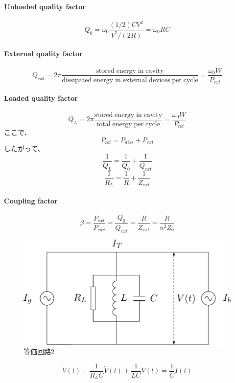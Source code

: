 \documentclass[book]{jlreq}
\begin{document}
\paragraph{Unloaded quality factor}
%
\begin{equation}
    Q_0 = \omega_0 \frac{(1/2) C V^2}{V^2/(2R)} = \omega_0 R C 
\end{equation}
%
\paragraph{External quality factor}
%
\begin{equation}
    Q_{ext} = 2\pi \frac{\mathrm{stored\;energy\;in\;cavity}}{\mathrm{dissipated \; energy\;in\;external\;devices\;per\;cycle}}
     = \frac{\omega_0 W}{P_{ext}}
\end{equation}
%
\paragraph{Loaded quality factor}
%
\begin{equation}
    Q_L = 2\pi \frac{\mathrm{stored\;energy\;in\;cavity}}{\mathrm{total \; energy\;per\;cycle}} = \frac{\omega_0 W}{P_{tot}}
\end{equation}
%
ここで、
%
\begin{equation}
    P_{tot} = P_{diss} + P_{ext}
\end{equation}
%
したがって、
%
\begin{equation}
    \frac{1}{Q_L} = \frac{1}{Q_0} + \frac{1}{Q_{ext}}
\end{equation}
%
\begin{equation}
    \frac{1}{R_L} = \frac{1}{R} + \frac{1}{Z_{ext}}
\end{equation}
%
\paragraph{Coupling factor \beta}
%
\begin{equation}
    \beta = \frac{P_{ext}}{P_{cav}} = \frac{Q_0}{Q_{ext}} = \frac{R}{Z_{ext}} = \frac{R}{n^2 Z_0}
\end{equation}
%
\begin{figure}[hbt]
    \begin{center}
      \includegraphics[width=12cm,clip]{figs/Equivalent_Circuit2}
      \caption{等価回路2}
     \label{Equivalent_Circuit2}
    \end{center}
\end{figure}
%
\begin{equation}
    \ddot{V}(t) + \frac{1}{R_L C}\dot{V}(t) + \frac{1}{L C} V(t) = \frac{1}{C} \dot{I}(t)
\end{equation}
%
\end{document}
